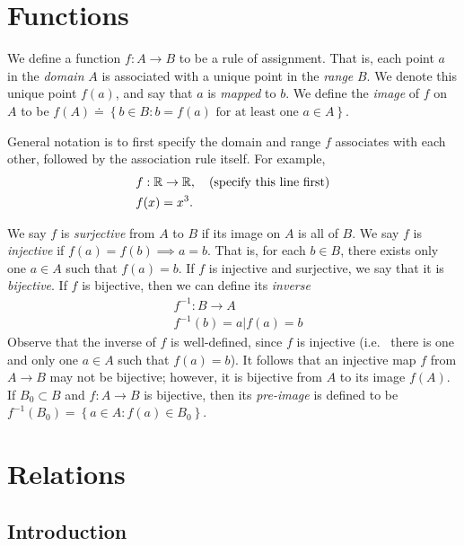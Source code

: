 \section{Functions}
We define a function $f: A \to B$ to be a rule of assignment. That is,
each point $a$ in the \emph{domain} $A$ is associated with a unique point in
the \emph{range} $B$. We denote this unique point $f(a)$, and say that
$a$ is \emph{mapped} to $b$. We define the \emph{image} of $f$ on $A$ to be
$f(A) \doteq \left\{ b \in B: b = f(a) \text{ for at least one } a \in A
\right\}$.
\begin{example}
	General notation is to first specify the domain and range $f$ associates with each
	other, followed by the association rule itself. For example,
	\begin{equation*}
		\begin{split}
			& f: \mathbb{R} \to \mathbb{R}, \quad \text{(specify this line first)}\\
			& f(x) = x^{3}.
		\end{split}
	\end{equation*}
\end{example}
We say $f$ is \emph{surjective} from $A$ to $B$ if its image on $A$ is all of
$B$. We say $f$ is \emph{injective} if $f(a) = f(b) \implies a = b$. That is,
for each $b \in B$, there exists only one $a \in A$ such that $f(a) = b$.
If $f$ is injective and surjective, we say that it is \emph{bijective}.
If $f$ is bijective, then we can define its \emph{inverse} 
\begin{equation*}
	\begin{split}
		& f^{-1}: B \to A
		\\
		& f^{-1}(b) = a | f(a) = b
	\end{split}
\end{equation*}
Observe that the inverse of $f$ is well-defined, since $f$ is injective (i.e. \
there is one and only one $a \in A$ such that $f(a) = b$). It follows that
an injective map $f$ from $A \to B$ may not be bijective; however, it is
bijective from $A$ to its image $f(A)$. If $B_{0} \subset B$ and $f: A \to B$ is
bijective, then its
\emph{pre-image} is defined to be $f^{-1}(B_{0}) = \left\{ a \in A: f(a) \in
B_{0} \right\}$.
\section{Relations}
\subsection{Introduction} 

